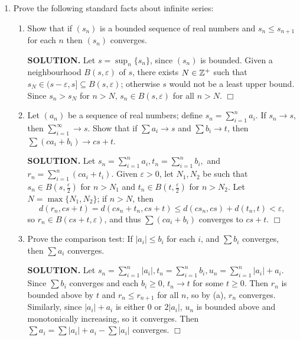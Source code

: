 \documentclass{article}
\begin{document}
\begin{enumerate}
    {\bf SOLUTION.} $[1, 1]$ is closed in $\reals$. $A$ may be written as $(\cdot)^{-1}([1, 1])$ where $\cdot: \reals \times \reals \rightarrow \reals$ is the multiplication function. By continuity, $A$ is closed in $\reals^2$. Similarly, $S^1$ is the preimage of $[1, 1]$ under $x^2+y^2$, which is a composition of addition and multiplication functions, and $B^2$ is the preimage of the closed set $[0, 1]$ under $x^2+y^2$. $\Box$

    \item Prove the following standard facts about infinite series:
    \begin{enumerate}
        \item Show that if $(s_n)$ is a bounded sequence of real numbers and $s_n \leq s_{n+1}$ for each $n$ then $(s_n)$ converges.

        {\bf SOLUTION.} Let $s = \sup_n\{s_n\}$, since $(s_n)$ is bounded. Given a neighbourhood $B(s, \varepsilon)$ of $s$, there exists $N \in \mathbb{Z}^+$ such that $s_N \in (s-\varepsilon, s] \subseteq B(s, \varepsilon)$; otherwise $s$ would not be a least upper bound. Since $s_n > s_N$ for $n > N$, $s_n \in B(s, \varepsilon)$ for all $n > N$. $\Box$

        \item Let $(a_n)$ be a sequence of real numbers; define $s_n = \sum_{i=1}^na_i$. If $s_n \rightarrow s$, then $\sum_{i=1}^\infty \rightarrow s$. Show that if $\sum a_i \rightarrow s$ and $\sum b_i \rightarrow t$, then $\sum (ca_i+b_i) \rightarrow cs+t$.

        {\bf SOLUTION.} Let $s_n = \sum_{i=1}^n a_i, t_n = \sum_{i=1}^n b_i,$ and $r_n = \sum_{i=1}^n (ca_i +t_i)$. Given $\varepsilon > 0$, let $N_1, N_2$ be such that $s_n \in B(s, \frac{\varepsilon}{2})$ for $n > N_1$ and $t_n \in B(t, \frac{\varepsilon}{2})$ for $n > N_2$. Let $N = \max \{N_1, N_2\}$; if $n > N$, then
        $$d(r_n, cs+t) = d(cs_n + t_n, cs+t) \leq d(cs_n, cs) + d(t_n, t) < \varepsilon,$$
        so $r_n \in B(cs+t, \varepsilon)$, and thus $\sum (ca_i+b_i)$ converges to $cs+t$. $\Box$

        \item Prove the comparison test: If $|a_i| \leq b_i$ for each $i$, and $\sum b_i$ converges, then $\sum a_i$ converges.

        {\bf SOLUTION.} Let $s_n = \sum_{i=1}^n |a_i|, t_n = \sum_{i=1}^n b_i, u_n = \sum_{i=1}^n |a_i| + a_i$. Since $\sum b_i$ converges and each $b_i \geq 0$, $t_n \rightarrow t$ for some $t \geq 0$. Then $r_n$ is bounded above by $t$ and $r_n \leq r_{n+1}$ for all $n$, so by (a), $r_n$ converges. Similarly, since $|a_i| + a_i$ is either $0$ or $2|a_i|$, $u_n$ is bounded above and monotonically increasing, so it converges. Then $\sum a_i = \sum |a_i| + a_i - \sum |a_i|$ converges. $\Box$


\end{enumerate}
\end{enumerate}
\end{document}
